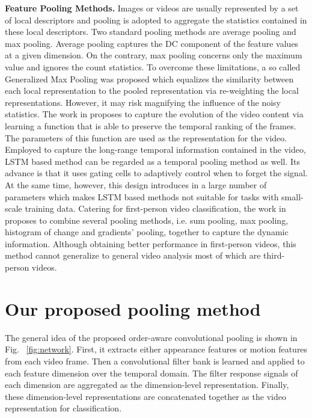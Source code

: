 \documentclass[journal]{IEEEtran}
\begin{document}
\noindent \textbf{Feature Pooling Methods.} Images or videos are usually represented by a set of local descriptors and pooling is adopted to aggregate the statistics contained in these local descriptors. Two standard pooling methods are average pooling and max pooling. Average pooling captures the DC component of the feature values at a given dimension.
%
On the contrary, max pooling concerns only the maximum value and ignores the count statistics.
%
To overcome these limitations, a so called Generalized Max Pooling \cite{Murray:2014:GMP} was proposed which equalizes the similarity between each local representation to the pooled representation via re-weighting the local representations. However, it may risk magnifying the influence of the noisy statistics.
The work in \cite{Fernando2015a} proposes to capture the evolution of the video content via learning a function that is able to preserve the temporal ranking of the frames. The parameters of this function are used as the representation for the video. Employed to capture the long-range temporal information contained in the video, LSTM based method can be regarded as a temporal pooling method as well. Its advance is that it uses gating cells to adaptively control when to forget the signal. At the same time, however, this design introduces in a large number of parameters which makes LSTM based methods not suitable for tasks with small-scale training data. Catering for first-person video classification, the work in \cite{Ryoo_2015_CVPR} proposes to combine several pooling methods, i.e. sum pooling, max pooling, histogram of change and gradients' pooling, together to capture the dynamic information. Although obtaining better performance in first-person videos, this method cannot generalize to general video analysis most of which are third-person videos.




\section{Our proposed pooling method}
\label{our approach}
The general idea of the proposed order-aware convolutional pooling is shown in Fig.~ \ref{fig:network}. First, it extracts either appearance features or motion features from each video frame. Then a convolutional filter bank is learned and applied to each feature dimension over the temporal domain. The filter response signals of each dimension are aggregated as the dimension-level representation. Finally, these dimension-level representations are concatenated together as the video representation for classification.
\end{document}
